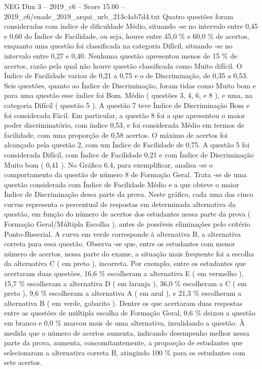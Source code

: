 \begin{textsample}{NEG Dim 3 – 2019\_c6 – Score 15.00 – 2019\_c6/enade\_2019\_arqui\_urb\_213c4ab7d4.txt}
Quatro questões foram consideradas com índice de dificuldade Médio, situando -se no intervalo entre 0,45 e 0,60 do Índice de Facilidade, ou seja, houve entre 45,0 \% e 60,0 \% de acertos, enquanto uma questão foi classificada na categoria Difícil, situando -se no intervalo entre 0,27 e 0,40.
Nenhuma questão apresentou menos de 15 \% de acertos, razão pela qual não houve questão classificada como Muito difícil.
O Índice de Facilidade variou de 0,21 a 0,75 e o de Discriminação, de 0,35 a 0,53.
Seis questões, quanto ao Índice de Discriminação, foram tidas como Muito bom e para uma questão esse índice foi Bom.
Médio ( questões 3, 4, 6, e 8 ), e uma, na categoria Difícil ( questão 5 ).
A questão 7 teve Índice de Discriminação Bom e foi considerada Fácil.
Em particular, a questão 8 foi a que apresentou o maior poder discriminatório, com índice 0,53, e foi considerada Médio em termos de facilidade, com uma proporção de 0,58 acertos.
O máximo de acertos foi alcançado pela questão 2, com um Índice de Facilidade de 0,75.
A questão 5 foi considerada Difícil, com Índice de Facilidade 0,21 e com Índice de Discriminação Muito bom ( 0,41 ).
No Gráfico 6.4, para exemplificar, analisa -se o comportamento da questão de número 8 de Formação Geral.
Trata -se de uma questão considerada com Índice de Facilidade Médio e a que obteve o maior Índice de Discriminação dessa parte da prova.
Neste gráfico, cada uma das cinco curvas representa o percentual de respostas em determinada alternativa da questão, em função do número de acertos dos estudantes nessa parte da prova ( Formação Geral/Múltipla Escolha ), antes de possíveis eliminações pelo critério Ponto-Bisserial.
A curva em verde corresponde à alternativa B, a alternativa correta para essa questão.
Observa -se que, entre os estudantes com menor número de acertos, nessa parte do exame, a situação mais frequente foi a escolha da alternativa C ( em preto ), incorreta.
Por exemplo, entre os estudantes que acertaram duas questões, 16,6 \% escolheram a alternativa E ( em vermelho ), 15,7 \% escolheram a alternativa D ( em laranja ), 36,0 \% escolheram a C ( em preto ), 9,6 \% escolheram a alternativa A ( em azul ), e 21,3 \% escolheram a alternativa B ( em verde, gabarito ).
Dentre os que acertaram duas respostas entre as questões de múltipla escolha de Formação Geral, 0,6 \% deixou a questão em branco e 0,0 \% marcou mais de uma alternativa, invalidando a questão.
À medida que o número de acertos aumenta, indicando desempenho melhor nessa parte da prova, aumenta, concomitantemente, a proporção de estudantes que selecionaram a alternativa correta B, atingindo 100 \% para os estudantes com sete acertos.

\end{textsample}
